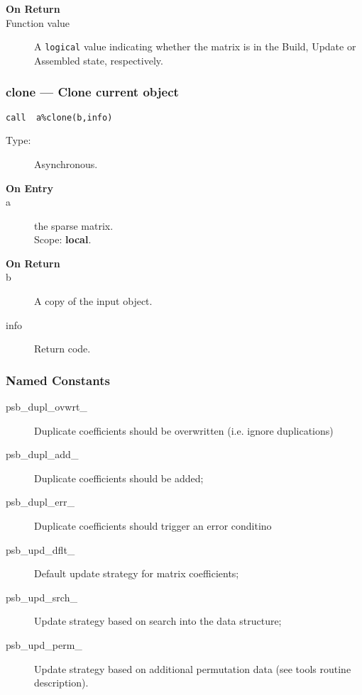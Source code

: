 \begin{description}
\item[\bf On Return]
\item[Function value] A \verb|logical| value indicating whether the
  matrix is in the Build, Update or Assembled state, respectively. 
\end{description}


\subsubsection*{clone --- Clone current object}

\begin{verbatim}
call  a%clone(b,info)
\end{verbatim}

\begin{description}
\item[Type:] Asynchronous.
\item[\bf On Entry]
\item[a] the sparse matrix.\\
Scope: {\bf local}.\\
\end{description}

\begin{description}
\item[\bf On Return]
\item[b] A copy of the input object.
\item[info] Return code. 
\end{description}


\subsubsection{Named Constants}
\label{sec:sp_constants}
\begin{description}
\item[psb\_dupl\_ovwrt\_] Duplicate coefficients should be overwritten
  (i.e. ignore duplications)
\item[psb\_dupl\_add\_] Duplicate coefficients should be added;	         
\item[psb\_dupl\_err\_] Duplicate coefficients should trigger an error conditino
\item[psb\_upd\_dflt\_] Default update strategy for matrix coefficients;
\item[psb\_upd\_srch\_] Update strategy based on search into the data structure;
\item[psb\_upd\_perm\_] Update strategy based on additional
  permutation data (see tools routine description).
\end{description}


